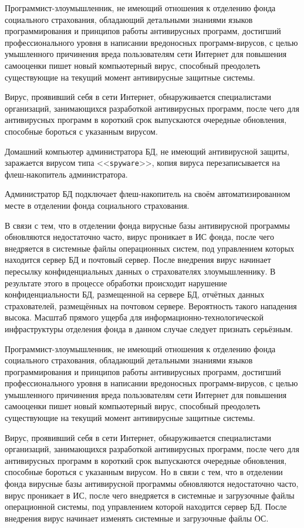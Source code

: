 \point Программист-злоумышленник, не имеющий отношения к отделению фонда
социального страхования, обладающий детальными знаниями языков
программирования и принципов работы антивирусных программ, достигший
профессионального уровня в написании вредоносных программ-вирусов, с
целью умышленного причинения вреда пользователям сети Интернет для
повышения самооценки пишет новый компьютерный вирус, способный
преодолеть существующие на текущий момент антивирусные защитные
системы.

Вирус, проявивший себя в сети Интернет, обнаруживается специалистами
организаций, занимающихся разработкой антивирусных программ, после
чего для антивирусных программ в короткий срок выпускаются очередные
обновления, способные бороться с указанным вирусом.

Домашний компьютер администратора БД, не имеющий антивирусной защиты,
заражается вирусом типа <<\texttt{spyware}>>, копия вируса
перезаписывается на флеш-накопитель администратора.

Администратор БД подключает флеш-накопитель на своём
автоматизированном месте в отделении фонда социального страхования.

В связи с тем, что в отделении фонда вирусные базы антивирусной
программы обновляются недостаточно часто, вирус проникает в ИС фонда,
после чего внедряется в системные файлы операционных систем, под
управлением которых находится сервер БД и почтовый сервер. После
внедрения вирус начинает пересылку конфиденциальных данных о
страхователях злоумышленнику. В результате этого в процессе обработки
происходит нарушение конфиденциальности БД, размещенной на сервере БД,
отчётных данных страхователей, размещённых на почтовом
сервере. Вероятность такого нападения высока. Масштаб прямого ущерба
для информационно-технологической инфраструктуры отделения фонда в
данном случае следует признать серьёзным.

\point Программист-злоумышленник, не имеющий отношения к отделению
фонда социального страхования, обладающий детальными знаниями языков
программирования и принципов работы антивирусных программ, достигший
профессионального уровня в написании вредоносных программ-вирусов, с
целью умышленного причинения вреда пользователям сети Интернет для
повышения самооценки пишет новый компьютерный вирус, способный
преодолеть существующие на текущий момент антивирусные защитные
системы.

Вирус, проявивший себя в сети Интернет, обнаруживается специалистами
организаций, занимающихся разработкой антивирусных программ, после
чего для антивирусных программ в короткий срок выпускаются очередные
обновления, способные бороться с указанным вирусом. Но в связи с тем,
что в отделении фонда вирусные базы антивирусной программы обновляются
недостаточно часто, вирус проникает в ИС, после чего внедряется в
системные и загрузочные файлы операционной системы, под управлением
которой находится сервер БД. После внедрения вирус начинает изменять
системные и загрузочные файлы ОС.

